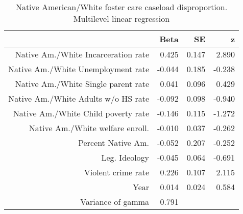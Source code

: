 \begin{table}[ht]
\centering
\caption{Native American/White foster care caseload disproportion. Multilevel linear regression} 
\label{a.d.tab}
\begin{tabular}{rrrr}
  \hline
 & Beta & SE & z \\ 
  \hline
Native Am./White Incarceration rate & 0.425 & 0.147 & 2.890 \\ 
  Native Am./White Unemployment rate & -0.044 & 0.185 & -0.238 \\ 
  Native Am./White Single parent rate & 0.041 & 0.096 & 0.429 \\ 
  Native Am./White Adults w/o HS rate & -0.092 & 0.098 & -0.940 \\ 
  Native Am./White Child poverty rate & -0.146 & 0.115 & -1.272 \\ 
  Native Am./White welfare enroll. & -0.010 & 0.037 & -0.262 \\ 
  Percent Native Am. & -0.052 & 0.207 & -0.252 \\ 
  Leg. Ideology & -0.045 & 0.064 & -0.691 \\ 
  Violent crime rate & 0.226 & 0.107 & 2.115 \\ 
  Year & 0.014 & 0.024 & 0.584 \\ 
  Variance of gamma & 0.791 &  &  \\ 
   \hline
\end{tabular}
\end{table}
